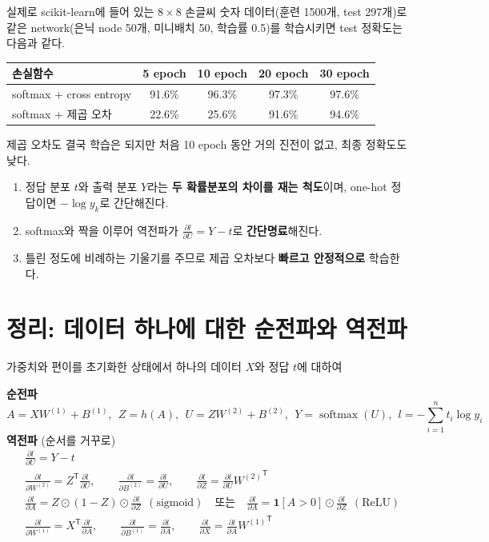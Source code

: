 \documentclass[11pt,a4paper]{article}
\newcommand{\T}{^{\mathsf T}}
\newcommand{\pd}[2]{\frac{\partial #1}{\partial #2}}
\newcommand{\softmax}{\operatorname{softmax}}
\begin{document}
실제로 scikit-learn에 들어 있는 $8\times8$ 손글씨 숫자 데이터(훈련 1500개, test 297개)로
같은 network(은닉 node 50개, 미니배치 50, 학습률 0.5)를 학습시키면 test 정확도는 다음과 같다.

\begin{center}
\begin{tabular}{@{}lcccc@{}}
\toprule
손실함수 & 5 epoch & 10 epoch & 20 epoch & 30 epoch \\
\midrule
softmax + cross entropy & 91.6\% & 96.3\% & 97.3\% & 97.6\% \\
softmax + 제곱 오차 & 22.6\% & 25.6\% & 91.6\% & 94.6\% \\
\bottomrule
\end{tabular}
\end{center}

제곱 오차도 결국 학습은 되지만 처음 10 epoch 동안 거의 진전이 없고, 최종 정확도도 낮다.

\begin{keybox}
\begin{enumerate}[leftmargin=1.8em]
\item 정답 분포 $t$와 출력 분포 $Y$라는 \textbf{두 확률분포의 차이를 재는 척도}이며,
one-hot 정답이면 $-\log y_k$로 간단해진다.
\item softmax와 짝을 이루어 역전파가 $\pd{l}{U}=Y-t$로 \textbf{간단명료}해진다.
\item 틀린 정도에 비례하는 기울기를 주므로 제곱 오차보다 \textbf{빠르고 안정적으로} 학습한다.
\end{enumerate}
\end{keybox}

\section{정리: 데이터 하나에 대한 순전파와 역전파}\label{sec:summary}

가중치와 편이를 초기화한 상태에서 하나의 데이터 $X$와 정답 $t$에 대하여

\begin{keybox}
\textbf{순전파}
\[
A=XW^{(1)}+B^{(1)},
\ \
Z=h(A),
\ \
U=ZW^{(2)}+B^{(2)},
\ \
Y=\softmax(U),
\ \
l=-\sum_{i=1}^{n}t_i\log y_i
\]
\textbf{역전파} (순서를 거꾸로)
\[
\begin{aligned}
&\pd{l}{U}=Y-t\\[4pt]
&\pd{l}{W^{(2)}}=Z\T\pd{l}{U},
\qquad
\pd{l}{B^{(2)}}=\pd{l}{U},
\qquad
\pd{l}{Z}=\pd{l}{U}{W^{(2)}}\T\\[4pt]
&\pd{l}{A}=Z\odot(1-Z)\odot\pd{l}{Z}\ \ (\text{sigmoid})
\quad\text{또는}\quad
\pd{l}{A}=\mathbf{1}[A>0]\odot\pd{l}{Z}\ \ (\text{ReLU})\\[4pt]
&\pd{l}{W^{(1)}}=X\T\pd{l}{A},
\qquad
\pd{l}{B^{(1)}}=\pd{l}{A},
\qquad
\pd{l}{X}=\pd{l}{A}{W^{(1)}}\T
\end{aligned}
\]
\end{keybox}
\end{document}

